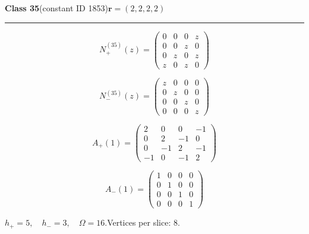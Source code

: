 \noindent\begin{minipage}{\linewidth}
\noindent\textbf{Class 35}\quad\small (constant ID 1853)\hfill $\symbf{r}=(2,2,2,2)$
\par\smallskip\noindent\textcolor{rulegray}{\rule{\linewidth}{0.3pt}}
\begin{minipage}[c]{0.495\linewidth}\centering\fontsize{9.7}{12}\selectfont
\setlength{\abovedisplayskip}{4pt}\setlength{\belowdisplayskip}{4pt}
\setlength{\abovedisplayshortskip}{4pt}\setlength{\belowdisplayshortskip}{4pt}
\setlength{\arraycolsep}{3pt}\renewcommand{\arraystretch}{1.08}
\[N_{+}^{(35)}(z)=\begin{pmatrix}0 & 0 & 0 & z\\0 & 0 & z & 0\\0 & z & 0 & z\\z & 0 & z & 0\end{pmatrix}\]
\end{minipage}%
\begin{minipage}[c]{0.495\linewidth}\centering\fontsize{9.7}{12}\selectfont
\setlength{\abovedisplayskip}{4pt}\setlength{\belowdisplayskip}{4pt}
\setlength{\abovedisplayshortskip}{4pt}\setlength{\belowdisplayshortskip}{4pt}
\setlength{\arraycolsep}{3pt}\renewcommand{\arraystretch}{1.08}
\[N_{-}^{(35)}(z)=\begin{pmatrix}z & 0 & 0 & 0\\0 & z & 0 & 0\\0 & 0 & z & 0\\0 & 0 & 0 & z\end{pmatrix}\]
\end{minipage}%
\par\noindent
\begin{minipage}[c]{0.495\linewidth}\centering\fontsize{9.7}{12}\selectfont
\setlength{\abovedisplayskip}{4pt}\setlength{\belowdisplayskip}{4pt}
\setlength{\abovedisplayshortskip}{4pt}\setlength{\belowdisplayshortskip}{4pt}
\setlength{\arraycolsep}{3pt}\renewcommand{\arraystretch}{1.08}
\[A_{+}(1)=\begin{pmatrix}2 & 0 & 0 & -1\\0 & 2 & -1 & 0\\0 & -1 & 2 & -1\\-1 & 0 & -1 & 2\end{pmatrix}\]
\end{minipage}%
\begin{minipage}[c]{0.495\linewidth}\centering\fontsize{9.7}{12}\selectfont
\setlength{\abovedisplayskip}{4pt}\setlength{\belowdisplayskip}{4pt}
\setlength{\abovedisplayshortskip}{4pt}\setlength{\belowdisplayshortskip}{4pt}
\setlength{\arraycolsep}{3pt}\renewcommand{\arraystretch}{1.08}
\[A_{-}(1)=\begin{pmatrix}1 & 0 & 0 & 0\\0 & 1 & 0 & 0\\0 & 0 & 1 & 0\\0 & 0 & 0 & 1\end{pmatrix}\]
\end{minipage}%
\par\smallskip\noindent\small $h_+=5,\quad h_-=3,\quad \Omega=16.$\quad Vertices per slice: 8.
\end{minipage}\par\vfill
\clearpage
